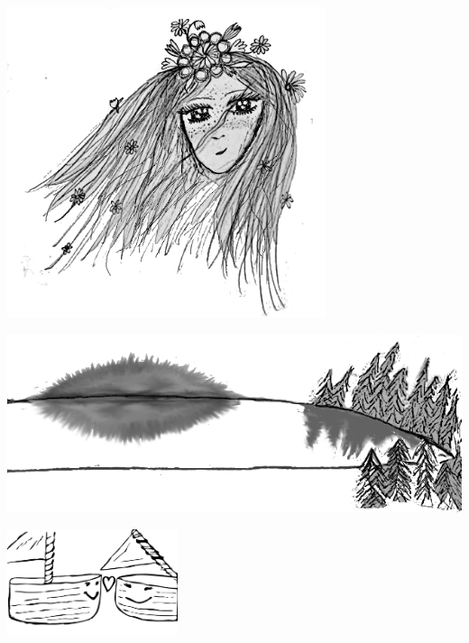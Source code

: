 \begin{intersong}
	\begin{center}
		\includegraphics[width=0.7\textwidth]{../bilder/fardigabilder/CamillasFardigaBilder/Svinstaskar2.png} 
	\end{center}
\end{intersong}
\sclearpage

\begin{intersong}
	\begin{center}
		\vspace{20mm}
		\includegraphics[width=1\textwidth]{../bilder/fardigabilder/CamillasFardigaBilder/Oppnalandskap3.png} 
	\end{center}
\end{intersong}
\sclearpage

\sclearpage





\begin{intersong}
	\begin{center}
		\vspace{20mm}
		\includegraphics[width=5cm]{../bilder/fardigabilder/Batlat.png} 
	\end{center}
\end{intersong}